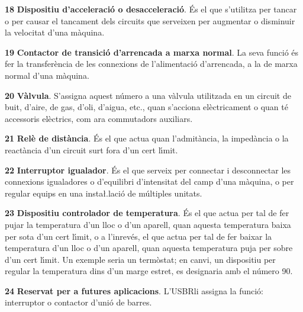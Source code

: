 \begin{multicols}{2}
\begin{list}{}
\item[\textbf{18}]  \textbf{Dispositiu d'acceleraci\'{o} o desacceleraci\'{o}}. \'{E}s
el que s'utilitza per tancar o per causar el tancament dels circuits
que serveixen per augmentar o disminuir la velocitat d'una m\`{a}quina.

\item[\textbf{19}] 
\textbf{Contactor de transici\'{o} d'arrencada a marxa normal}. La seva
funci\'{o} \'{e}s fer la transfer\`{e}ncia de les connexions de l'alimentaci\'{o}
d'arrencada, a la de marxa normal d'una m\`{a}quina.

\item[\textbf{20}]  \textbf{V\`{a}lvula}. S'assigna aquest n\'{u}mero a una v\`{a}lvula
utilitzada en un circuit de buit, d'aire, de gas, d'oli, d'aigua,
etc., quan s'acciona el\`{e}ctricament o quan t\'{e} accessoris el\`{e}ctrics,
com ara commutadors auxiliars.

\item[\textbf{21}]  \textbf{Rel\`{e} de dist\`{a}ncia}. \'{E}s el que actua
quan l'admit\`{a}ncia, la imped\`{a}ncia o la react\`{a}ncia d'un circuit surt fora d'un cert l\'{\i}mit.

\item[\textbf{22}]  \textbf{Interruptor igualador}.  \'{E}s el
que serveix per connectar i desconnectar les connexions igualadores
o d'equilibri d'intensitat del camp d'una m\`{a}quina, o per regular
equips en una  insta{\l.l}aci\'{o} de  m\'{u}ltiples unitats.

\item[\textbf{23}]  \textbf{Dispositiu
controlador de temperatura}. \'{E}s el que actua per tal de fer pujar la
temperatura d'un lloc o d'un aparell, quan aquesta temperatura baixa
per sota d'un cert l\'{\i}mit, o a l'inrev\'{e}s, el que actua per tal de fer
 baixar la temperatura d'un lloc o d'un aparell, quan aquesta
temperatura  puja per sobre d'un cert l\'{\i}mit. Un exemple seria un
term\`{o}stat; en canvi, un dispositiu per regular la temperatura dins
d'un marge estret, es designaria amb el n\'{u}mero 90.

\item[\textbf{24}] \textbf{Reservat per a  futures aplicacions}.
L'\textsf{USBR}\footnotemark[1] li assigna la funci\'{o}: interruptor o
contactor d'uni\'{o} de barres.


\end{list}
\end{multicols}
